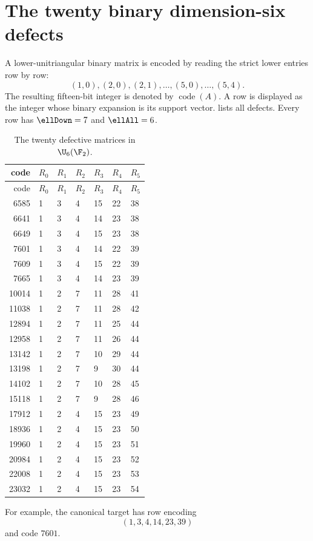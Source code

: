 \section{The twenty binary dimension-six defects}\label{app:twenty}

A lower-unitriangular binary matrix is encoded by reading the strict lower entries row by row:
\[
(1,0),
(2,0),(2,1),
\ldots,
(5,0),\ldots,(5,4).
\]
The resulting fifteen-bit integer is denoted by $\operatorname{code}(A)$.  A row is displayed as the integer whose binary expansion is its support vector.   lists all defects.  Every row has $\ellDown=7$ and $\ellAll=6$.

\begin{longtable}{@{}rllllll@{}}
\caption{The twenty defective matrices in $\U_6(\F_2)$.}\label{tab:twenty}\\
\toprule
code&$R_0$&$R_1$&$R_2$&$R_3$&$R_4$&$R_5$\\
\midrule
\endfirsthead
\toprule
code&$R_0$&$R_1$&$R_2$&$R_3$&$R_4$&$R_5$\\
\midrule
\endhead
6585&1&3&4&15&22&38\\
6641&1&3&4&14&23&38\\
6649&1&3&4&15&23&38\\
7601&1&3&4&14&22&39\\
7609&1&3&4&15&22&39\\
7665&1&3&4&14&23&39\\
10014&1&2&7&11&28&41\\
11038&1&2&7&11&28&42\\
12894&1&2&7&11&25&44\\
12958&1&2&7&11&26&44\\
13142&1&2&7&10&29&44\\
13198&1&2&7&9&30&44\\
14102&1&2&7&10&28&45\\
15118&1&2&7&9&28&46\\
17912&1&2&4&15&23&49\\
18936&1&2&4&15&23&50\\
19960&1&2&4&15&23&51\\
20984&1&2&4&15&23&52\\
22008&1&2&4&15&23&53\\
23032&1&2&4&15&23&54\\
\bottomrule
\end{longtable}

For example, the canonical target has row encoding
\[
(1,3,4,14,23,39)
\]
and code $7601$.

